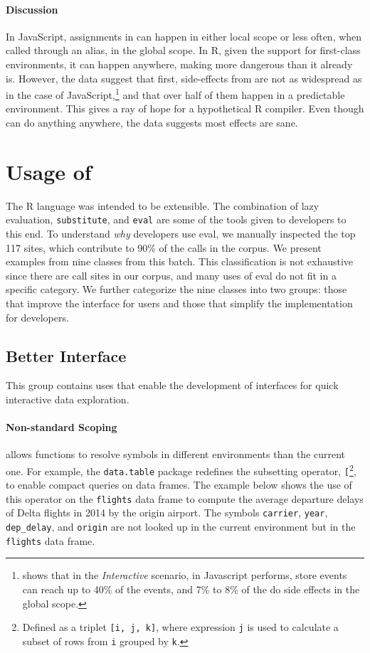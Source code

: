 \documentclass[acmsmall, screen]{acmart}
\renewcommand{\k}[1]{\lstinline |#1|\xspace}
\begin{document}
\paragraph{Discussion} In JavaScript, assignments in \eval can happen in either
local scope or less often, when called through an alias, in the global scope.
In R, given the support for first-class environments, it can happen anywhere,
making \eval more dangerous than it already is. However, the data suggest
that first, side-effects from \eval are not as widespread as in the case of
JavaScript,\footnote{\citep{ecoop11} shows that in the \emph{Interactive}
  scenario, \eval in Javascript performs, store events can reach up to 40\% of
the events, and 7\% to 8\% of the \eval do side effects in the global scope. }
and that over half of them happen in a predictable environment. This gives a
ray of hope for a hypothetical R compiler. Even though \eval can do anything
anywhere, the data suggests most effects are sane.

\section{Usage of \eval}

The R language was intended to be extensible. The combination of lazy
evaluation, \k{substitute}, and \k{eval} are some of the tools given to
developers to this end. To understand \emph{why} developers use eval, we
manually inspected the top 117 sites, which contribute to 90\% of the calls in
the corpus. We present examples from nine classes from this batch. This
classification is not exhaustive since there are \PkgEvalCallSites \eval call
sites in our corpus, and many uses of eval do not fit in a specific category.
We further categorize the nine classes into two groups: those that improve the
interface for users and those that simplify the implementation for developers.

\subsection{Better Interface}

This group contains \eval uses that enable the development of interfaces for
quick interactive data exploration.

\paragraph{Non-standard Scoping} \Eval allows functions to resolve symbols in
different environments than the current one. For example, the \k{data.table}
package redefines the subsetting operator, \k{[}\footnote{Defined as a triplet
  \texttt{[i, j, k]}, where expression \texttt{j} is used to calculate a subset
of rows from \texttt{i} grouped by \texttt{k}.}, to enable compact queries on
data frames. The example below shows the use of this operator on the
\k{flights} data frame to compute the average departure delays of Delta flights
in 2014 by the origin airport. The symbols \k{carrier}, \k{year},
\k{dep_delay}, and \k{origin} are not looked up in the current environment but
in the \k{flights} data frame.
\end{document}
